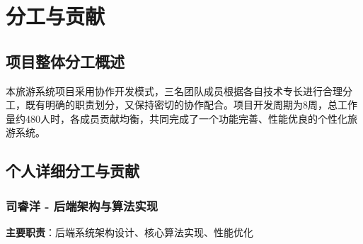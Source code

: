 \documentclass[12pt,a4paper]{article}
\begin{document}
\section{分工与贡献}

\subsection{项目整体分工概述}
本旅游系统项目采用协作开发模式，三名团队成员根据各自技术专长进行合理分工，既有明确的职责划分，又保持密切的协作配合。项目开发周期为8周，总工作量约480人时，各成员贡献均衡，共同完成了一个功能完善、性能优良的个性化旅游系统。

\subsection{个人详细分工与贡献}

\subsubsection{司睿洋 - 后端架构与算法实现}
\textbf{主要职责}：后端系统架构设计、核心算法实现、性能优化
\end{document}
